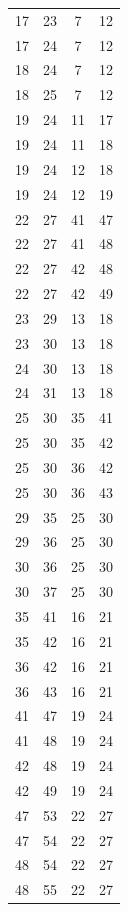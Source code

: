 \documentclass[
  doc,floatsintext]{apa6}
\begin{document}
\begin{center}
\begin{ThreePartTable}
{\begin{longtable}{cccc}
17 & 23 & 7 & 12\\
17 & 24 & 7 & 12\\
18 & 24 & 7 & 12\\
18 & 25 & 7 & 12\\
19 & 24 & 11 & 17\\
19 & 24 & 11 & 18\\
19 & 24 & 12 & 18\\
19 & 24 & 12 & 19\\
22 & 27 & 41 & 47\\
22 & 27 & 41 & 48\\
22 & 27 & 42 & 48\\
22 & 27 & 42 & 49\\
23 & 29 & 13 & 18\\
23 & 30 & 13 & 18\\
24 & 30 & 13 & 18\\
24 & 31 & 13 & 18\\
25 & 30 & 35 & 41\\
25 & 30 & 35 & 42\\
25 & 30 & 36 & 42\\
25 & 30 & 36 & 43\\
29 & 35 & 25 & 30\\
29 & 36 & 25 & 30\\
30 & 36 & 25 & 30\\
30 & 37 & 25 & 30\\
35 & 41 & 16 & 21\\
35 & 42 & 16 & 21\\
36 & 42 & 16 & 21\\
36 & 43 & 16 & 21\\
41 & 47 & 19 & 24\\
41 & 48 & 19 & 24\\
42 & 48 & 19 & 24\\
42 & 49 & 19 & 24\\
47 & 53 & 22 & 27\\
47 & 54 & 22 & 27\\
48 & 54 & 22 & 27\\
48 & 55 & 22 & 27\\
\bottomrule
\end{longtable}

}

\end{ThreePartTable}
\end{center}

\clearpage
\end{document}
